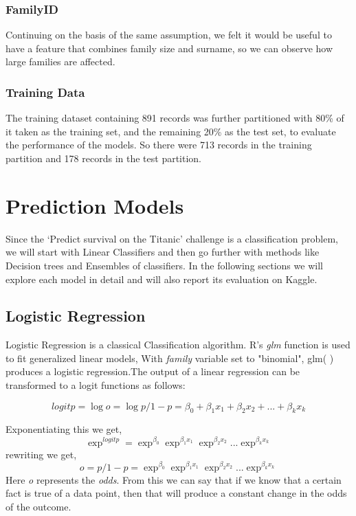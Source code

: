 \documentclass[a4paper,10pt]{report}\usepackage[]{graphicx}\usepackage[]{color}
\begin{document}
\subsection{FamilyID}
Continuing on the basis of the same assumption, we felt it would be useful to have a feature that combines family size and surname, so we can observe how large families are affected. 


\subsection{Training Data}
The training dataset containing 891 records was further partitioned with 80\% of it taken as the training set, and the remaining 20\% as the test set, to evaluate the performance of the models. So there were 713 records in the training partition and 178 records in the test partition.

\chapter{Prediction Models}
Since the `Predict survival on the Titanic' challenge is a classification problem, we will start with Linear Classifiers and then go further with methods like Decision trees and Ensembles of classifiers. In the following sections we will explore each model in detail and will also report its evaluation on Kaggle.

\section{Logistic Regression}
Logistic Regression is a classical Classification algorithm. R's \emph{glm} function is used to fit generalized linear models, With \emph{family} variable set to "binomial", glm( ) produces a logistic regression.The output of a linear regression can be transformed to a logit functions as follows:

$$
logit{p} = \log{o} = \log{p/1-p} = \beta_{0} + \beta_{1}x_{1} +\beta_{2}x_{2} + ...+\beta_{k}x_{k}
$$

Exponentiating this we get,
$$ \exp^{logit{p}} = \exp^{\beta_{0}} \exp^{\beta_{1}x_{1}} \exp^{\beta_{2}x_{2}}... \exp^{\beta_{k}x_{k}} $$
rewriting we get,
$$ o = p/1-p = \exp^{\beta_{0}} \exp^{\beta_{1}x_{1}} \exp^{\beta_{2}x_{2}}... \exp^{\beta_{k}x_{k}} $$
Here \emph{o} represents the \emph{odds}. From this we can say that if we know that a certain fact is true of a data point, then that will produce a constant change in the odds of the outcome.
\end{document}
